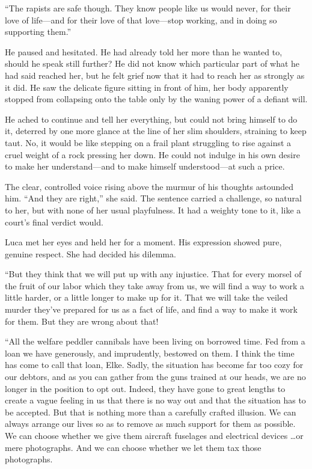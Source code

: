 ``The rapists are safe though. They know people like us would never, for their love of life---and for their love of that love---stop working, and in doing so supporting them.''

He paused and hesitated. He had already told her more than he wanted to, should he speak still further? He did not know which particular part of what he had said reached her, but he felt grief now that it had to reach her as strongly as it did. He saw the delicate figure sitting in front of him, her body apparently stopped from collapsing onto the table only by the waning power of a defiant will.

He ached to continue and tell her everything, but could not bring himself to do it, deterred by one more glance at the line of her slim shoulders, straining to keep taut. No, it would be like stepping on a frail plant struggling to rise against a cruel weight of a rock pressing her down. He could not indulge in his own desire to make her understand---and to make himself understood---at such a price.

The clear, controlled voice rising above the murmur of his thoughts astounded him. ``And they are right,'' she said. The sentence carried a challenge, so natural to her, but with none of her usual playfulness. It had a weighty tone to it, like a court's final verdict would.

Luca met her eyes and held her for a moment. His expression showed pure, genuine respect. She had decided his dilemma.

``But they think that we will put up with any injustice. That for every morsel of the fruit of our labor which they take away from us, we will find a way to work a little harder, or a little longer to make up for it. That we will take the veiled murder they've prepared for us as a fact of life, and find a way to make it work for them. But they are wrong about that!

``All the welfare peddler cannibals have been living on borrowed time. Fed from a loan we have generously, and imprudently, bestowed on them. I think the time has come to call that loan, Elke. Sadly, the situation has become far too cozy for our debtors, and as you can gather from the guns trained at our heads, we are no longer in the position to opt out. Indeed, they have gone to great lengths to create a vague feeling in us that there is no way out and that the situation has to be accepted. But that is nothing more than a carefully crafted illusion. We can always arrange our lives so as to remove as much support for them as possible. We can choose whether we give them aircraft fuselages and electrical devices \ldots or mere photographs. And we can choose whether we let them tax those photographs.

